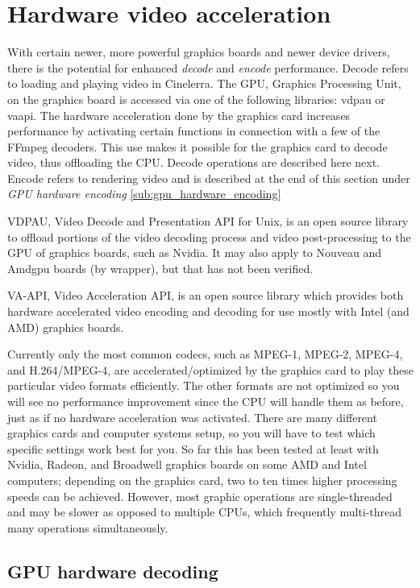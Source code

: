 \section{Hardware video acceleration}%
\label{sec:hardware_video_acceleration}

With certain newer, more powerful graphics boards and newer device drivers, there is the potential for enhanced \textit{decode} and \textit{encode} performance.   Decode refers to loading and playing video in Cinelerra. The GPU, Graphics Processing Unit, on the graphics board is accessed via one of the following libraries: vdpau or vaapi. The hardware acceleration done by the graphics card increases performance by activating certain functions in connection with a few of the FFmpeg decoders. This use makes it possible for the graphics card to decode video, thus offloading the CPU.  Decode operations are described here next.  Encode refers to rendering video and is described at the end of this section under \textit{GPU hardware encoding} \ref{sub:gpu_hardware_encoding}

VDPAU, Video Decode and Presentation API for Unix, is an open source library to offload portions of the video decoding process and video post-processing to the GPU of graphics boards, such as Nvidia.  It may also apply to Nouveau and Amdgpu boards (by wrapper), but that has not been verified.

VA-API, Video Acceleration API, is an open source library which provides both hardware accelerated video encoding and decoding for use mostly with Intel (and AMD) graphics boards. 

Currently only the most common codecs, such as MPEG-1, MPEG-2, MPEG-4, and H.264/MPEG-4, are accelerated/optimized by the graphics card to play these particular video formats efficiently. The other formats are not optimized so you will see no performance improvement since the CPU will handle them as before, just as if no hardware acceleration was activated. There are many different graphics cards and computer systems setup, so you will have to test which specific settings work best for you.  So far this has been tested at least with Nvidia, Radeon, and Broadwell graphics boards on some AMD and Intel computers; depending on the graphics card, two to ten times higher processing speeds can be achieved.  However, most graphic operations are single-threaded and may be slower as opposed to multiple CPUs, which frequently multi-thread many operations simultaneously.

\subsection{GPU hardware decoding}%
\label{sub:gpu_hardware_decoding}

